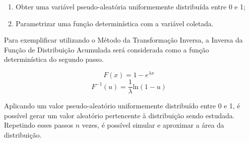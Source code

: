 \documentclass{article}
\begin{document}
\begin{enumerate}
\item Obter uma variável pseudo-aleatória uniformemente distribuída entre 0 e 1;
\item Parametrizar uma função determinística com a variável coletada.
\end{enumerate}

Para exemplificar utilizando o Método da Transformação Inversa, a Inversa da Função de Distribuição Acumulada será considerada como a função determinística do segundo passo.

\[F(x) = 1 - e^{\lambda x}\]
\[F^{-1}(u) = \frac{1}{\lambda} \text{ln}(1-u)\]

Aplicando um valor pseudo-aleatório uniformemente distribuído entre 0 e 1, é possível gerar um valor aleatório pertencente à distribuição sendo estudada. Repetindo esses passos $n$ vezes, é possível simular e aproximar a área da distribuição. 
\end{document}
